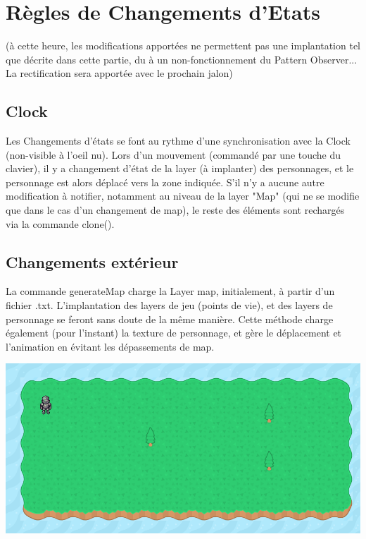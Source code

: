 \documentclass[12pt,a4paper]{report}
\begin{document}
        \chapter{Règles de Changements d'Etats}
        (à cette heure, les modifications apportées ne permettent pas une implantation tel que décrite dans cette partie, du à un non-fonctionnement du Pattern Observer... La rectification sera apportée avec le prochain jalon)
    \section{Clock}
    Les Changements d'états se font au rythme d'une synchronisation avec la Clock (non-visible à l'oeil nu). Lors d'un mouvement (commandé par une touche du clavier), il y a changement d'état de la layer (à implanter) des personnages, et le personnage est alors déplacé vers la zone indiquée. S'il n'y a aucune autre modification à notifier, notamment au niveau de la layer "Map" (qui ne se modifie que dans le cas d'un changement de map), le reste des éléments sont rechargés via la commande clone().
    \section{Changements extérieur}
	La commande generateMap charge la Layer map, initialement, à partir d'un fichier .txt. L'implantation des layers de jeu (points de vie), et des layers de personnage se feront sans doute de la même manière. Cette méthode charge également (pour l'instant) la texture de personnage, et gère le déplacement et l'animation en évitant les dépassements de map.

\includegraphics[width=1\textwidth]{MapPerso.png}
    
\end{document}
